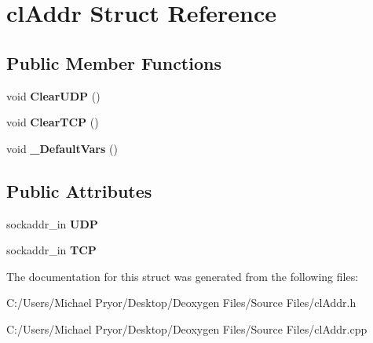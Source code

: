 \hypertarget{structcl_addr}{
\section{clAddr Struct Reference}
\label{structcl_addr}
}
\subsection*{Public Member Functions}
\begin{DoxyCompactItemize}
\item 
\hypertarget{structcl_addr_a85ae16c85a6c0266fc6dd62fe9813208}{
void {\bfseries ClearUDP} ()}
\label{structcl_addr_a85ae16c85a6c0266fc6dd62fe9813208}

\item 
\hypertarget{structcl_addr_a678f970070748d4d188288f0dd450445}{
void {\bfseries ClearTCP} ()}
\label{structcl_addr_a678f970070748d4d188288f0dd450445}

\item 
\hypertarget{structcl_addr_adcb784ad991e740c32cca7ecf70cd2a1}{
void {\bfseries \_\-DefaultVars} ()}
\label{structcl_addr_adcb784ad991e740c32cca7ecf70cd2a1}

\end{DoxyCompactItemize}
\subsection*{Public Attributes}
\begin{DoxyCompactItemize}
\item 
\hypertarget{structcl_addr_a584419673083913918f5dd587b736903}{
sockaddr\_\-in {\bfseries UDP}}
\label{structcl_addr_a584419673083913918f5dd587b736903}

\item 
\hypertarget{structcl_addr_a4945c69d60cb1a2013146a3842c8cc33}{
sockaddr\_\-in {\bfseries TCP}}
\label{structcl_addr_a4945c69d60cb1a2013146a3842c8cc33}

\end{DoxyCompactItemize}


The documentation for this struct was generated from the following files:\begin{DoxyCompactItemize}
\item 
C:/Users/Michael Pryor/Desktop/Deoxygen Files/Source Files/clAddr.h\item 
C:/Users/Michael Pryor/Desktop/Deoxygen Files/Source Files/clAddr.cpp\end{DoxyCompactItemize}
